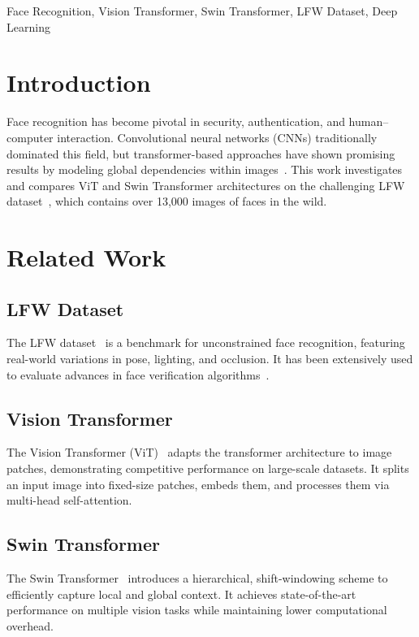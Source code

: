 \documentclass[twocolumn]{IEEEtran}
\begin{document}
\vspace{1em}

\noindent
\begin{IEEEkeywords}
Face Recognition, Vision Transformer, Swin Transformer, LFW Dataset, Deep Learning
\end{IEEEkeywords}

\section{Introduction}
\setlength{\parindent}{4em}
Face recognition has become pivotal in security, authentication, and human–computer interaction. Convolutional neural networks (CNNs) traditionally dominated this field, but transformer-based approaches have shown promising results by modeling global dependencies within images~\cite{dosovitskiy2020image}. This work investigates and compares ViT and Swin Transformer architectures on the challenging LFW dataset~\cite{huang2008lfw}, which contains over 13,000 images of faces in the wild.

\section{Related Work}
\subsection{LFW Dataset}
\setlength{\parindent}{4em}
The LFW dataset~\cite{huang2008lfw} is a benchmark for unconstrained face recognition, featuring real-world variations in pose, lighting, and occlusion. It has been extensively used to evaluate advances in face verification algorithms~\cite{learned2016lfwweb}.

\subsection{Vision Transformer}
The Vision Transformer (ViT)~\cite{dosovitskiy2020image} adapts the transformer architecture to image patches, demonstrating competitive performance on large-scale datasets. It splits an input image into fixed-size patches, embeds them, and processes them via multi-head self-attention.

\subsection{Swin Transformer}
The Swin Transformer~\cite{liu2021swin} introduces a hierarchical, shift-windowing scheme to efficiently capture local and global context. It achieves state-of-the-art performance on multiple vision tasks while maintaining lower computational overhead.
\end{document}
